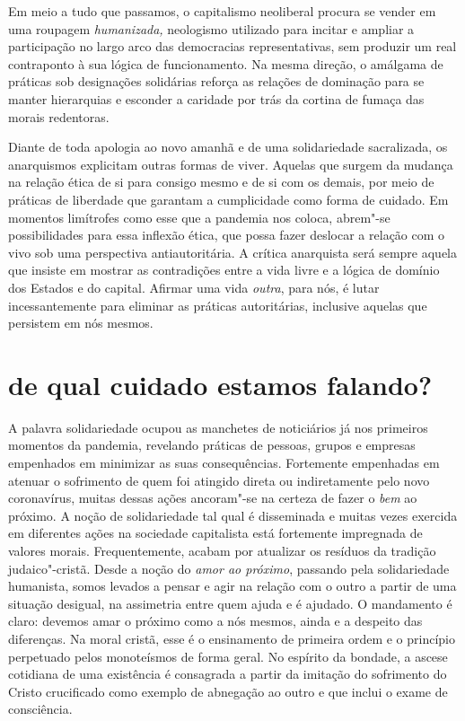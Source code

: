 Em meio a tudo que passamos, o capitalismo neoliberal procura se vender
em uma roupagem \emph{humanizada,} neologismo utilizado para incitar e
ampliar a participação no largo arco das democracias representativas,
sem produzir um real contraponto à sua lógica de funcionamento. Na mesma
direção, o amálgama de práticas sob designações solidárias reforça as
relações de dominação para se manter hierarquias e esconder a caridade
por trás da cortina de fumaça das morais redentoras.

Diante de toda apologia ao novo amanhã e de uma solidariedade
sacralizada, os anarquismos explicitam outras formas de viver. Aquelas
que surgem da mudança na relação ética de si para consigo mesmo e de si
com os demais, por meio de práticas de liberdade que garantam a
cumplicidade como forma de cuidado. Em momentos limítrofes como esse que
a pandemia nos coloca, abrem"-se possibilidades para essa inflexão ética,
que possa fazer deslocar a relação com o vivo sob uma perspectiva
antiautoritária. A crítica anarquista será sempre aquela que insiste em
mostrar as contradições entre a vida livre e a lógica de domínio dos
Estados e do capital. Afirmar uma vida \emph{outra}, para nós, é lutar
incessantemente para eliminar as práticas autoritárias, inclusive
aquelas que persistem em nós mesmos.

\section{de qual cuidado estamos falando?}

A palavra solidariedade ocupou as manchetes de noticiários já nos
primeiros momentos da pandemia, revelando práticas de pessoas, grupos e
empresas empenhados em minimizar as suas consequências. Fortemente
empenhadas em atenuar o sofrimento de quem foi atingido direta ou
indiretamente pelo novo coronavírus, muitas dessas ações ancoram"-se na
certeza de fazer o \emph{bem} ao próximo. A noção de solidariedade tal
qual é disseminada e muitas vezes exercida em diferentes ações na
sociedade capitalista está fortemente impregnada de valores morais.
Frequentemente, acabam por atualizar os resíduos da tradição
judaico"-cristã. Desde a noção do \emph{amor ao próximo}, passando pela
solidariedade humanista, somos levados a pensar e agir na relação com o
outro a partir de uma situação desigual, na assimetria entre quem ajuda
e é ajudado. O mandamento é claro: devemos amar o próximo como a nós
mesmos, ainda e a despeito das diferenças. Na moral cristã, esse é o
ensinamento de primeira ordem e o princípio perpetuado pelos monoteísmos
de forma geral. No espírito da bondade, a ascese cotidiana de uma
existência é consagrada a partir da imitação do sofrimento do Cristo
crucificado como exemplo de abnegação ao outro e que inclui o exame de
consciência.

